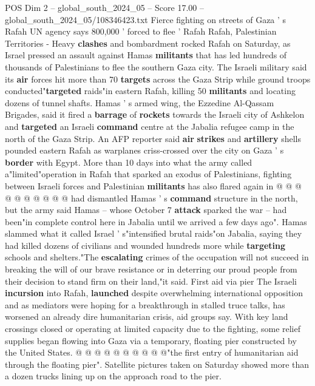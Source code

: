 \begin{textsample}{POS Dim 2 – global\_south\_2024\_05 – Score 17.00 – global\_south\_2024\_05/108346423.txt}  \label{ex:f2_pos_225}
Fierce fighting on streets of Gaza ' s Rafah UN agency says 800,000 ' forced to flee ' Rafah Rafah, Palestinian Territories - Heavy \textbf{clashes} and bombardment rocked Rafah on Saturday, as Israel pressed an assault against Hamas \textbf{militants} that has led hundreds of thousands of Palestinians to flee the southern Gaza city.
The Israeli military said its \textbf{air} forces hit more than 70 \textbf{targets} across the Gaza Strip while ground troops conducted"\textbf{targeted} raids"in eastern Rafah, killing 50 \textbf{militants} and locating dozens of tunnel shafts.
Hamas ' s armed wing, the Ezzedine Al-Qassam Brigades, said it fired a \textbf{barrage} of \textbf{rockets} towards the Israeli city of Ashkelon and \textbf{targeted} an Israeli \textbf{command} centre at the Jabalia refugee camp in the north of the Gaza Strip.
An AFP reporter said \textbf{air} \textbf{strikes} and \textbf{artillery} shells pounded eastern Rafah as warplanes criss-crossed over the city on Gaza ' s \textbf{border} with Egypt.
More than 10 days into what the army called a"limited"operation in Rafah that sparked an exodus of Palestinians, fighting between Israeli forces and Palestinian \textbf{militants} has also flared again in @ @ @ @ @ @ @ @ @ @ had dismantled Hamas ' s \textbf{command} structure in the north, but the army said Hamas -- whose October 7 \textbf{attack} sparked the war -- had been"in complete control here in Jabalia until we arrived a few days ago".
Hamas slammed what it called Israel ' s"intensified brutal raids"on Jabalia, saying they had killed dozens of civilians and wounded hundreds more while \textbf{targeting} schools and shelters."The \textbf{escalating} crimes of the occupation will not succeed in breaking the will of our brave resistance or in deterring our proud people from their decision to stand firm on their land,"it said.
First aid via pier The Israeli \textbf{incursion} into Rafah, \textbf{launched} despite overwhelming international opposition and as mediators were hoping for a breakthrough in stalled truce talks, has worsened an already dire humanitarian crisis, aid groups say.
With key land crossings closed or operating at limited capacity due to the fighting, some relief supplies began flowing into Gaza via a temporary, floating pier constructed by the United States. @ @ @ @ @ @ @ @ @ @"the first entry of humanitarian aid through the floating pier".
Satellite pictures taken on Saturday showed more than a dozen trucks lining up on the approach road to the pier.

\end{textsample}
